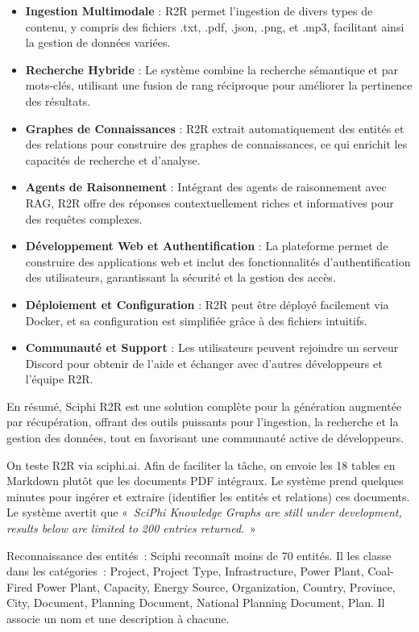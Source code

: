 \documentclass[a4paper,11pt]{report}
\providecommand{\tightlist}{\setlength{\itemsep}{0pt}\setlength{\parskip}{0pt}}
\begin{document}
\begin{itemize}
\tightlist
\item
  \textbf{Ingestion Multimodale} : R2R permet l'ingestion de divers types de contenu, y compris des fichiers .txt, .pdf, .json, .png, et .mp3, facilitant ainsi la gestion de données variées.
\item
  \textbf{Recherche Hybride} : Le système combine la recherche sémantique et par mots-clés, utilisant une fusion de rang réciproque pour améliorer la pertinence des résultats.
\item
  \textbf{Graphes de Connaissances} : R2R extrait automatiquement des entités et des relations pour construire des graphes de connaissances, ce qui enrichit les capacités de recherche et d'analyse.
\item
  \textbf{Agents de Raisonnement} : Intégrant des agents de raisonnement avec RAG, R2R offre des réponses contextuellement riches et informatives pour des requêtes complexes.
\item
  \textbf{Développement Web et Authentification} : La plateforme permet de construire des applications web et inclut des fonctionnalités d'authentification des utilisateurs, garantissant la sécurité et la gestion des accès.
\item
  \textbf{Déploiement et Configuration} : R2R peut être déployé facilement via Docker, et sa configuration est simplifiée grâce à des fichiers intuitifs.
\item
  \textbf{Communauté et Support} : Les utilisateurs peuvent rejoindre un serveur Discord pour obtenir de l'aide et échanger avec d'autres développeurs et l'équipe R2R.
\end{itemize}

En résumé, Sciphi R2R est une solution complète pour la génération augmentée par récupération, offrant des outils puissants pour l'ingestion, la recherche et la gestion des données, tout en favorisant une communauté active de développeurs.

On teste R2R via sciphi.ai. Afin de faciliter la tâche, on envoie les 18 tables en Markdown plutôt que les documents PDF intégraux. Le système prend quelques minutes pour ingérer et extraire (identifier les entités et relations) ces documents. Le système avertit que «~\emph{SciPhi Knowledge Graphs are still under development, results below are limited to 200 entries returned}.~»

Reconnaissance des entités~: Sciphi reconnaît moins de 70 entités. Il les classe dans les catégories~: Project, Project Type, Infrastructure, Power Plant, Coal-Fired Power Plant, Capacity, Energy Source, Organization, Country, Province, City, Document, Planning Document, National Planning Document, Plan. Il associe un nom et une description à chacune.
\end{document}
